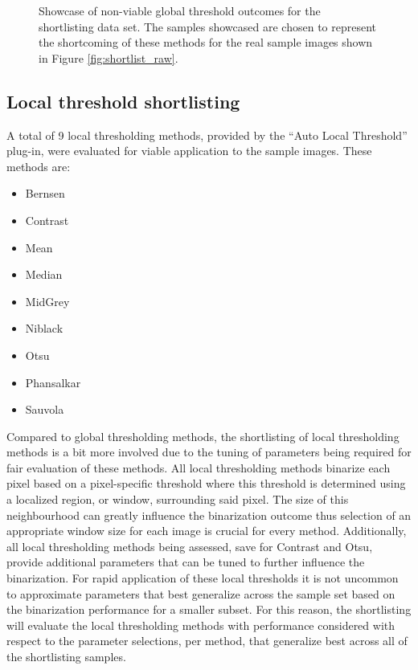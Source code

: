 \begin{figure}[ht!]
	\caption[Showcase of non-viable global threshold outcomes for the shortlisting data set.]{Showcase of non-viable global threshold outcomes for the shortlisting data set. The samples showcased are chosen to represent the shortcoming of these methods for the real sample images shown in Figure \ref{fig:shortlist_raw}.}
	\label{fig:bad_global_subset}
\end{figure}
\FloatBarrier
\subsection{Local threshold shortlisting}
A total of 9 local thresholding methods, provided by the ``Auto Local Threshold'' plug-in, were evaluated for viable application to the sample images. These methods are:
\begin{multicols}{3}
	\begin{itemize}
		\setlength\itemsep{1mm}
		\item Bernsen
		\item Contrast
		\item Mean
		\item Median
		\item MidGrey
		\item Niblack
		\item Otsu
		\item Phansalkar
		\item Sauvola
	\end{itemize}
\end{multicols}
Compared to global thresholding methods, the shortlisting of local thresholding methods is a bit more involved due to the tuning of parameters being required for fair evaluation of these methods. All local thresholding methods binarize each pixel based on a pixel-specific threshold where this threshold is determined using a localized region, or window, surrounding said pixel. The size of this neighbourhood can greatly influence the binarization outcome thus selection of an appropriate window size for each image is crucial for every method. Additionally, all local thresholding methods being assessed, save for Contrast and Otsu, provide additional parameters that can be tuned to further influence the binarization. For rapid application of these local thresholds it is not uncommon to approximate parameters that best generalize across the sample set based on the binarization performance for a smaller subset. For this reason, the shortlisting will evaluate the local thresholding methods with performance considered with respect to the parameter selections, per method, that generalize best across all of the shortlisting samples. 
